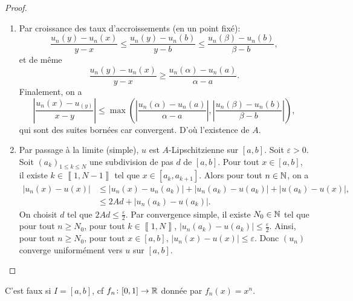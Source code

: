 \begin{proof}
    \phantom{}
    \begin{enumerate}
        \item Par croissance des taux d'accroissements (en un point fixé):
        \begin{equation}
            \frac{u_n(y)-u_n(x)}{y-x}\leqslant\frac{u_n(y)-u_n(b)}{y-b}\leqslant\frac{u_n(\beta)-u_n(b)}{\beta-b},
        \end{equation}
        et de même
        \begin{equation}
            \frac{u_n(y)-u_n(x)}{y-x}\geqslant\frac{u_n(\alpha)-u_n(a)}{\alpha-a}.
        \end{equation}
        Finalement, on a 
        \begin{equation}
            \left\lvert\frac{u_n(x)-u_(y)}{x-y}\right\rvert\leqslant\max\left(\left\lvert\frac{u_n(\alpha)-u_n(a)}{\alpha-a}\right\rvert,\left\lvert\frac{u_n(\beta)-u_n(b)}{\beta-b}\right\rvert\right),
        \end{equation}
        qui sont des suites bornées car convergent. D'où l'existence de $A$.

        \item Par passage à la limite (simple), $u$ est $A$-Lipschitzienne sur $[a,b]$. Soit $\varepsilon>0$. Soit $(a_{k})_{1\leqslant k\leqslant N}$ une subdivision de pas $d$ de $[a,b]$. Pour tout $x\in[a,b]$, il existe $k\in\left\llbracket1,N-1\right\rrbracket$ tel que $x\in[a_{k},a_{k+1}]$.
        Alors pour tout $n\in\mathbb{N}$, on a 
        \begin{align}
            \left\lvert u_n(x)-u(x)\right\rvert
            &\leqslant\left\lvert u_n(x)-u_n(a_k)\right\rvert+\left\lvert u_n(a_k)-u(a_k)\right\rvert+\left\lvert u(a_k)-u(x)\right\rvert,\\
            &\leqslant2Ad+\left\lvert u_n(a_k)-u(a_k)\right\rvert.
        \end{align}
        On choisit $d$ tel que $2Ad\leqslant\frac{\varepsilon}{2}$. Par convergence simple, il existe $N_{0}\in\mathbb{N}$ tel que pour tout $n\geqslant N_{0}$, pour tout $k\in\left\llbracket1,N\right\rrbracket$, $\left\lvert u_n(a_k)-u(a_k)\right\rvert\leqslant\frac{\varepsilon}{2}$. Ainsi, pour tout $n\geqslant N_{0}$, pour tout $x\in[a,b]$, $\left\lvert u_n(x)-u(x)\right\rvert\leqslant\varepsilon$. Donc $(u_n)$ converge uniformément vers $u$ sur $[a,b]$.
    \end{enumerate}
\end{proof}

\begin{remark}
    C'est faux si $I=[a,b]$, cf $f_n\colon[0,1]\to\mathbb{R}$ donnée par $f_n(x)=x^{n}$.
\end{remark}

